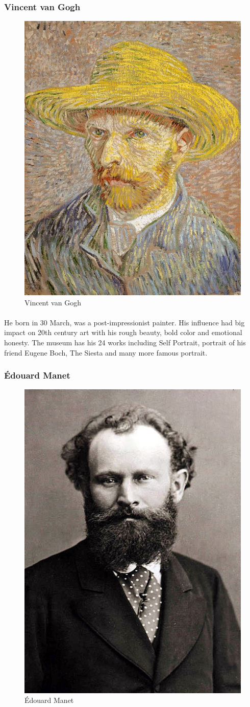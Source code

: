 \documentclass[
10pt, %
a4paper, %
oneside, %
headinclude,footinclude, %
BCOR5mm, %
]{scrartcl}
\theoremstyle{definition} %
\theoremstyle{plain} %
\theoremstyle{remark} %
\begin{document}
\subsubsection{Vincent van Gogh}
\begin{figure}[tbH]
\centering
\includegraphics[width=.30\columnwidth]{Images/9.png}
\caption[Vincent van Gogh]{Vincent van Gogh} %
\label{fig:vanGogh}
\end{figure}

\paragraph{}
He born in 30 March, was a post-impressionist painter. His influence had big impact on 20th century art with his rough beauty, bold color and emotional honesty.  The museum has his 24 works including Self Portrait, portrait of his friend Eugene Boch, The Siesta and many more famous portrait.

\subsubsection{Édouard Manet}
\begin{figure}[tbH]
\centering
\includegraphics[width=.30\columnwidth]{Images/11.png}
\caption[Édouard Manet]{Édouard Manet} %
\label{fig:manet}
\end{figure}
\end{document}
